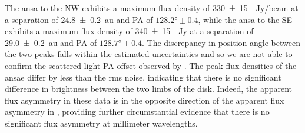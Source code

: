 \documentclass[modern]{aastex62}
\begin{document}
The ansa to the NW exhibits a maximum flux density of \SI{330 \pm 15}{\mu Jy/beam} at a separation of \SI{24.8 \pm 0.2}{au} and PA of $\ang[angle-symbol-over-decimal]{128.2} \pm 0.4$, while the ansa to the SE exhibits a maximum flux density of \SI{340 \pm 15}{\mu Jy} at a separation of \SI{29.0 \pm 0.2}{au} and PA of $\ang[angle-symbol-over-decimal]{128.7} \pm 0.4$. 
The discrepancy in position angle between the two peaks falls within the estimated uncertainties and so we are not able to confirm the scattered light PA offset observed by \cite{boccaletti15}. 
The peak flux densities of the ansae differ by less than the rms noise, indicating that there is no significant difference in brightness between the two limbs of the disk.
Indeed, the apparent flux asymmetry in these data is in the opposite direction of the apparent flux asymmetry in \cite{macgregor13}, providing further circumstantial evidence that there is no significant flux asymmetry at millimeter wavelengths. 
\end{document}
